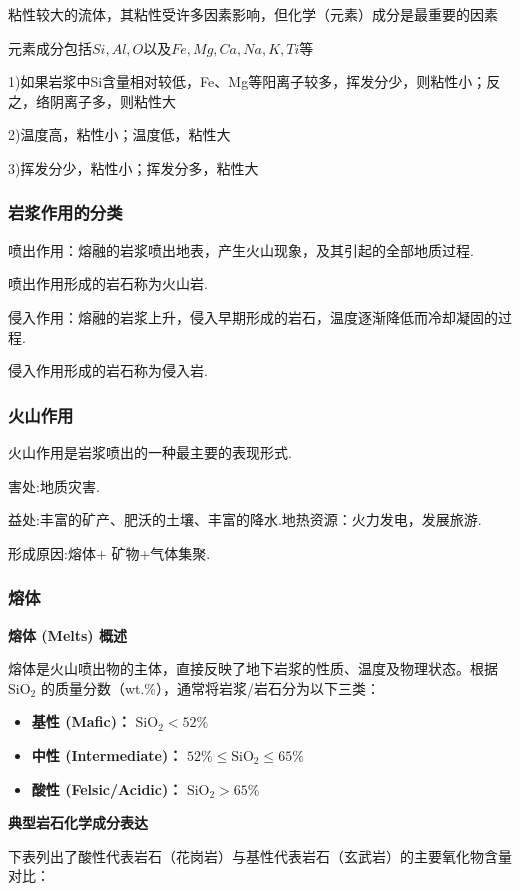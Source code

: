 \documentclass[12pt,a4paper]{article}
\begin{document}
	粘性较大的流体，其粘性受许多因素影响，但化学（元素）成分是最重要的因素
	
	元素成分包括$Si, Al, O$以及$Fe, Mg, Ca, Na, K, Ti$等
	
	1)如果岩浆中Si含量相对较低，Fe、Mg等阳离子较多，挥发分少，则粘性小；反之，络阴离子多，则粘性大
	
	2)温度高，粘性小；温度低，粘性大
	
	3)挥发分少，粘性小；挥发分多，粘性大
	
	\subsubsection{岩浆作用的分类}
	喷出作用：熔融的岩浆喷出地表，产生火山现象，及其引起的全部地质过程.
	
	喷出作用形成的岩石称为火山岩.
	
	侵入作用：熔融的岩浆上升，侵入早期形成的岩石，温度逐渐降低而冷却凝固的过程.
	
	侵入作用形成的岩石称为侵入岩.
	\subsubsection{火山作用}
	火山作用是岩浆喷出的一种最主要的表现形式.
	
	害处:地质灾害.
	
	益处:丰富的矿产、肥沃的土壤、丰富的降水.地热资源：火力发电，发展旅游.
	
	形成原因:熔体+ 矿物+气体集聚.
	
	\subsubsection{熔体}
	\textbf{熔体 (Melts) 概述}
	
	熔体是火山喷出物的主体，直接反映了地下岩浆的性质、温度及物理状态。根据 $\text{SiO}_2$ 的质量分数（wt.\%），通常将岩浆/岩石分为以下三类：
	
	\begin{itemize}
		\item \textbf{基性 (Mafic)：} $\text{SiO}_2 < 52\%$
		\item \textbf{中性 (Intermediate)：} $52\% \le \text{SiO}_2 \le 65\%$
		\item \textbf{酸性 (Felsic/Acidic)：} $\text{SiO}_2 > 65\%$
	\end{itemize}
	
	\textbf{典型岩石化学成分表达}
	
	下表列出了酸性代表岩石（花岗岩）与基性代表岩石（玄武岩）的主要氧化物含量对比：
	
\end{document}
